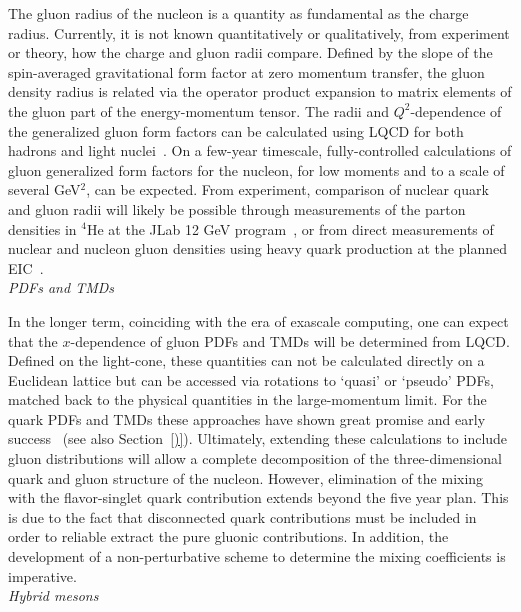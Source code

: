 The gluon radius of the nucleon is a quantity as fundamental as the charge radius. Currently, it is not known quantitatively or qualitatively, from experiment or theory, how the charge and gluon radii compare. 
Defined by the slope of the spin-averaged gravitational form factor at zero momentum transfer, the gluon density radius is related via the operator product expansion to matrix elements of the gluon part of the energy-momentum tensor.
The radii and $Q^2$-dependence of the generalized gluon form factors can be calculated using LQCD for both hadrons and light nuclei~\cite{Detmold:2017oqb,Winter:2017bfs}.
On a few-year timescale, fully-controlled calculations of gluon generalized form factors for the nucleon, for low moments and to a scale of several GeV$^2$, can be expected.
From experiment, comparison of nuclear quark and gluon radii will likely be possible through measurements of the parton densities in ${}^4$He at the JLab 12 GeV program~\cite{Hattawy:2017woc}, or from direct measurements of nuclear and nucleon gluon densities using heavy quark production at the planned EIC~\cite{Chudakov:2016otl}. \\


{\it PDFs and TMDs}

In the longer term, coinciding with the era of exascale computing, one can expect that the $x$-dependence of gluon PDFs and TMDs will be determined from LQCD. Defined on the light-cone, these quantities can not be calculated directly on a Euclidean lattice but can be accessed via rotations to `quasi' or `pseudo' PDFs, matched back to the physical quantities in the large-momentum limit. For the quark PDFs and TMDs these approaches have shown great promise and early success~\cite{Lin:2014zya,Alexandrou:2015rja} ({see also \color{red} Section~\ref{)}}). Ultimately, extending these calculations to include gluon distributions will allow a complete decomposition of the three-dimensional quark and gluon structure of the nucleon. However, elimination of the mixing with the flavor-singlet quark contribution extends beyond the five year plan. This is due to the fact that disconnected quark contributions must be included in order to reliable extract the pure gluonic contributions. In addition, the development of a non-perturbative scheme to determine the mixing coefficients is imperative.  \\

{\it Hybrid mesons}

